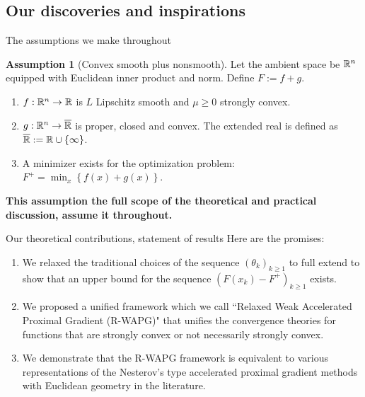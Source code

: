 \documentclass[11pt]{beamer}
\theoremstyle{definition}
\newtheorem{assumption}{Assumption}[section]
\begin{document}
    \subsection{Our discoveries and inspirations}
        \begin{frame}{The assumptions we make throughout}
            \begin{assumption}[Convex smooth plus nonsmooth]
                Let the ambient space be $\mathbb R^n$ equipped with Euclidean inner product and norm. 
                Define $F := f + g$.
                \begin{enumerate}
                    \item $f: \mathbb R^n \rightarrow \mathbb R$ is $L$ Lipschitz smooth and $\mu \ge 0$ strongly convex.
                    \item $g: \mathbb R^n \rightarrow \overline {\mathbb R}$ is proper, closed and convex. The extended real is defined as $\overline {\mathbb R} := \mathbb R \cup \{\infty\}$.
                    \item A minimizer exists for the optimization problem: $F^+ = \min_x \left\lbrace f(x) + g(x)\right\rbrace$.
                \end{enumerate}
            \end{assumption}
            \textbf{This assumption the full scope of the theoretical and practical discussion, assume it throughout.}
        \end{frame}
        \begin{frame}{Our theoretical contributions, statement of results}
            Here are the promises: 
            \begin{enumerate}
                \item We relaxed the traditional choices of the sequence $(\theta_k)_{k \ge 1}$ to full extend to show that an upper bound for the sequence $(F(x_k) - F^+)_{k \ge 1}$ exists. 
                \item We proposed a unified framework which we call ``Relaxed Weak Accelerated Proximal Gradient (R-WAPG)" that unifies the convergence theories for functions that are strongly convex or not necessarily strongly convex. 
                \item We demonstrate that the R-WAPG framework is equivalent to various representations of the Nesterov's type accelerated proximal gradient methods with Euclidean geometry in the literature. 
            \end{enumerate}
             
        \end{frame}
\end{document}
